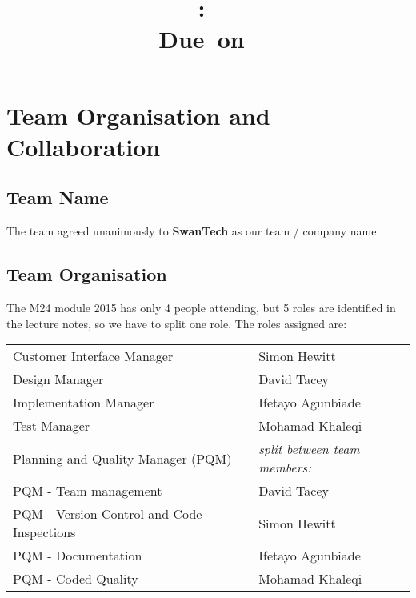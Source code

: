 \documentclass{article}
\title{
\vspace{2in}
\textmd{\textbf{\hmwkClass:\ \hmwkTitle}}\\
\normalsize\vspace{0.1in}\small{Due\ on\ \hmwkDueDate}\\
\vspace{0.1in}\large{\textit{\hmwkClassInstructor}}
\vspace{3in}
}
\author{\textbf{\hmwkAuthorName}}
\date{} %
\begin{document}
\maketitle



\newpage
\tableofcontents
\newpage
\section{Team Organisation and Collaboration}
\subsection{Team Name}
The team agreed unanimously to \textbf{SwanTech} as our team / company name.
\subsection{Team Organisation}
The M24 module 2015 has only 4 people attending, but 5 roles are identified in the lecture notes, so we have to split one role. The roles assigned are:\\

\begin{tabular}{ |l|l| }   %
 \hline
 Customer Interface Manager & Simon Hewitt  \\ 
 Design Manager & David Tacey  \\ 
 Implementation Manager & Ifetayo Agunbiade  \\ 
 Test Manager & Mohamad Khaleqi \\
 Planning and Quality Manager  (PQM)& \textit{split between team members:}\\
 PQM - Team management & David Tacey\\
 PQM - Version Control and Code Inspections & Simon Hewitt\\
 PQM - Documentation & Ifetayo Agunbiade\\
 PQM - Coded Quality & Mohamad Khaleqi \\
 \hline
\end{tabular}\\
\end{document}
